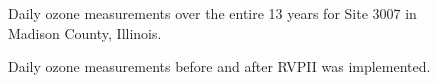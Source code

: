 \documentclass{article}
\begin{document}
\begin{figure}[h]

\caption{\label{fig:max_all2}Daily ozone measurements over the entire 13 years for Site 3007 in Madison County, Illinois.}
\end{figure}



\begin{figure}[h]

\caption{\label{fig:max_doy2}Daily ozone measurements before and after RVPII was implemented.}
\end{figure}
\end{document}
